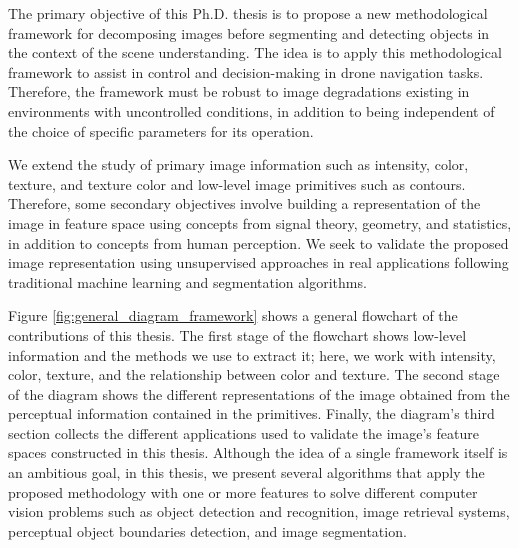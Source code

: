 
The primary objective of this Ph.D. thesis is to propose a new methodological framework for decomposing images before segmenting and detecting objects in the context of the scene understanding. The idea is to apply this methodological framework to assist in control and decision-making in drone navigation tasks. Therefore, the framework must be robust to image degradations existing in environments with uncontrolled conditions, in addition to being independent of the choice of specific parameters for its operation.

%
We extend the study of primary image information such as intensity, color, texture, and texture color and low-level image primitives such as contours. Therefore, some secondary objectives involve building a representation of the image in feature space using concepts from signal theory, geometry, and statistics, in addition to concepts from human perception. We seek to validate the proposed image representation using unsupervised approaches in real applications following traditional machine learning and segmentation algorithms.

Figure \ref{fig:general_diagram_framework} shows a general flowchart of the contributions of this thesis. The first stage of the flowchart shows low-level information and the methods we use to extract it; here, we work with intensity, color, texture, and the relationship between color and texture. The second stage of the diagram shows the different representations of the image obtained from the perceptual information contained in the primitives. Finally, the diagram's third section collects the different applications used to validate the image's feature spaces constructed in this thesis. Although the idea of a single framework itself is an ambitious goal, in this thesis, we present several algorithms that apply the proposed methodology with one or more features to solve different computer vision problems such as object detection and recognition, image retrieval systems, perceptual object boundaries detection, and image segmentation.

